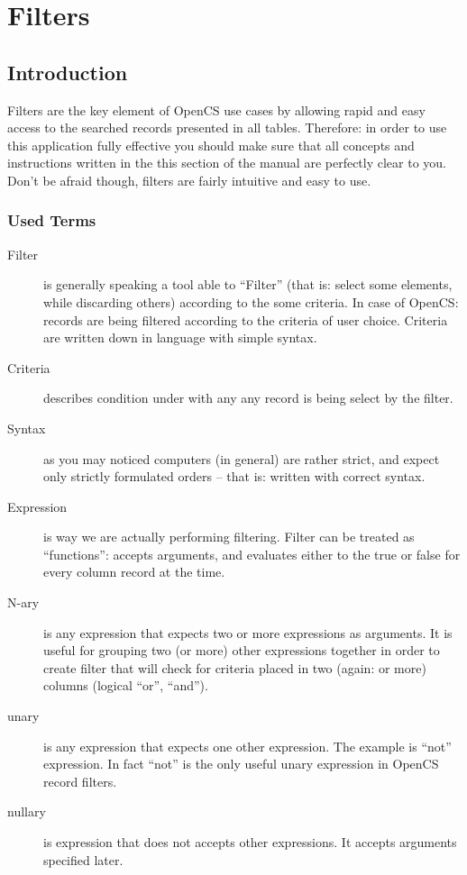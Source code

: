 \section{Filters}
\subsection{Introduction}
Filters are the key element of OpenCS use cases by allowing rapid and easy access to the searched records presented in all tables. Therefore: in order to use this application fully effective you should make sure that all concepts and instructions written in the this section of the manual are perfectly clear to you.\\
Don't be afraid though, filters are fairly intuitive and easy to use.

\subsubsection{Used Terms}

\begin{description}
 \item[Filter] is generally speaking a tool able to ``Filter'' (that is: select some elements, while discarding others) according to the some criteria. In case of OpenCS: records are being filtered according to the criteria of user choice. Criteria are written down in language with simple syntax.
 \item[Criteria] describes condition under with any any record is being select by the filter.
 \item[Syntax] as you may noticed computers (in general) are rather strict, and expect only strictly formulated orders -- that is: written with correct syntax.
 \item[Expression] is way we are actually performing filtering. Filter can be treated as ``functions'': accepts arguments, and evaluates either to the true or false for every column record at the time.
 \item[N-ary] is any expression that expects two or more expressions as arguments. It is useful for grouping two (or more) other expressions together in order to create filter that will check for criteria placed in two (again: or more) columns (logical ``or'', ``and'').
 \item[unary] is any expression that expects one other expression. The example is ``not'' expression. In fact ``not'' is the only useful unary expression in OpenCS record filters.
 \item[nullary] is expression that does not accepts other expressions. It accepts arguments specified later.
\end{description}

